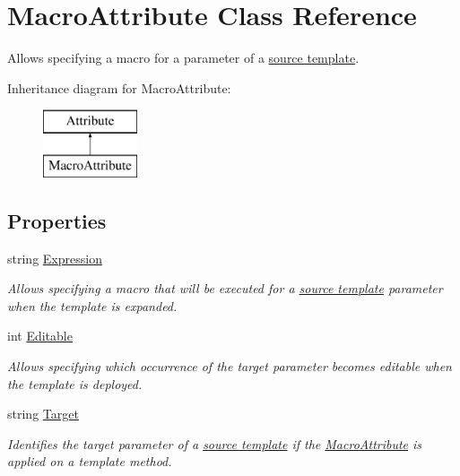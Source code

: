 \hypertarget{class_macro_attribute}{}\section{Macro\+Attribute Class Reference}
\label{class_macro_attribute}


Allows specifying a macro for a parameter of a \hyperlink{class_source_template_attribute}{source template}.  


Inheritance diagram for Macro\+Attribute\+:\begin{figure}[H]
\begin{center}
\leavevmode
\includegraphics[height=2.000000cm]{class_macro_attribute}
\end{center}
\end{figure}
\subsection*{Properties}
\begin{DoxyCompactItemize}
\item 
string \hyperlink{class_macro_attribute_a172bf7385bb748baa1eb2fa931f1f9f8}{Expression}
\begin{DoxyCompactList}\small\item\em Allows specifying a macro that will be executed for a \hyperlink{class_source_template_attribute}{source template} parameter when the template is expanded. \end{DoxyCompactList}\item 
int \hyperlink{class_macro_attribute_a273bac2efafc085eba59752b2ea3ae58}{Editable}
\begin{DoxyCompactList}\small\item\em Allows specifying which occurrence of the target parameter becomes editable when the template is deployed. \end{DoxyCompactList}\item 
string \hyperlink{class_macro_attribute_a94502148414b928f01ad540a924846d0}{Target}
\begin{DoxyCompactList}\small\item\em Identifies the target parameter of a \hyperlink{class_source_template_attribute}{source template} if the \hyperlink{class_macro_attribute}{Macro\+Attribute} is applied on a template method. \end{DoxyCompactList}\end{DoxyCompactItemize}


